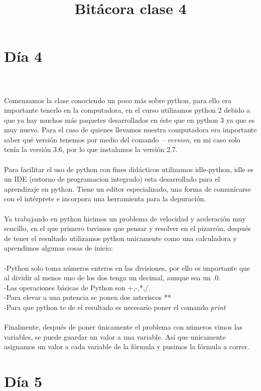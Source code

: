 \documentclass{book}
\begin{document}
	\section{Día 4}
	\title{\Huge Bitácora clase 4} \\
	\\
	Comenzamos la clase conociendo un poco más sobre python, para ello era importante tenerlo en la computadora, en el curso utilizamos python 2 debido a que ya hay muchos más paquetes desarrollados en éste que en python 3 ya que es muy nuevo. Para el caso de quienes llevamos nuestra computadora era importante saber qué versión tenemos por medio del comando \textit{-- version}, en mi caso solo tenía la versión 3.6, por lo que instalamos la versión 2.7. \\
	\\
	Para facilitar el uso de python con fines didácticos utilizamos idle-python, idle es un IDE (entorno de programacion integrado) esta desarrollado para el aprendizaje en python. Tiene un editor especializado, una forma de comunicarse con el intérprete e incorpora una herramienta para la depuración.\\
	\\
	Ya trabajando en python hicimos un problema de velocidad y aceleración muy sencillo, en el que primero tuvimos que pensar y resolver en el pizarrón, después de tener el resultado utilizamos python unicamente como una calculadora y aprendimos algunas cosas de inicio:\\
	\\
	-Python solo toma números enteros en las divisiones, por ello es importante que al dividir al menos uno de los dos tenga un decimal, aunque sea un .0.\\
	-Las operaciones básicas de Python son +,-,*,/.\\
	-Para elevar a una potencia se ponen dos asteriscos **\\
	-Para que python te de el resultado es necesario poner el comando \textit{print}\\
	\\
	Finalmente, después de poner únicamente el problema con números vimos las variables, se puede guardar un valor a una variable. Así que unicamente asignamos un valor a cada variable de la fórmula y pusimos la fórmula a correr. \\
	
	
	
	
	\section{Día 5}
		
\end{document}

